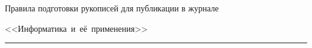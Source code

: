





\def\stat{cont-rus}


{%




\vspace*{-24pt}


\raggedleft\Large \bf%


Правила подготовки рукописей  для публикации в журнале


<<Информатика~и~её~применения>> \vskip 8pt


    \hrule


    \par


 }





\label{st\stat}





\def\tit{\ }





\def\aut{\ }


\def\auf{\ }





\def\leftkol{\ }









\def\rightkol{\ }












\titele{\tit}{\aut}{\auf}{\leftkol}{\rightkol}





\def\leftfootline{\ }


\def\rightfootline{\ }





\vspace*{-60pt}


